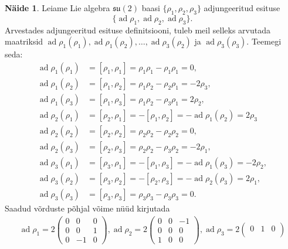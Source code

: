 \documentclass[a4paper,12pt]{article}
\theoremstyle{plain}
\theoremstyle{definition}
\newtheorem{naide}{Näide}[section]
\numberwithin{equation}{section}
\DeclareMathOperator{\ad}{ad}
\begin{document}
\begin{naide}
Leiame Lie algebra $\mathfrak{su}\left(2\right)$ baasi $\{\rho_1, \rho_2, \rho_3\}$ adjungeeritud esituse
\[\{\ad \rho_1, \ad \rho_2, \ad \rho_3\}.\]
Arvestades adjungeeritud esituse definitsiooni, tuleb meil selleks arvutada maatriksid $\ad \rho_1 \left(\rho_1\right), \ad \rho_1 \left(\rho_2\right), \ldots, \ad \rho_3 \left(\rho_2\right)$ ja $\ad \rho_3 \left(\rho_3\right)$. Teemegi seda:
\begin{align*}
\ad \rho_1 \left(\rho_1\right) &= \left[\rho_1, \rho_1\right] = \rho_1 \rho_1 - \rho_1 \rho_1 = 0, \\
\ad \rho_1 \left(\rho_2\right) &= \left[\rho_1, \rho_2\right] = \rho_1 \rho_2 - \rho_2 \rho_1 = -2\rho_3, \\
\ad \rho_1 \left(\rho_3\right) &= \left[\rho_1, \rho_3\right] = \rho_1 \rho_2 - \rho_3 \rho_1 = 2\rho_2,  \\
\ad \rho_2 \left(\rho_1\right) &= \left[\rho_2, \rho_1\right] = - \left[\rho_1, \rho_2\right] = - \ad \rho_1 \left(\rho_2\right) = 2\rho_3 \\
\ad \rho_2 \left(\rho_2\right) &= \left[\rho_2, \rho_2\right] = \rho_2 \rho_2 - \rho_2 \rho_2 = 0, \\
\ad \rho_2 \left(\rho_3\right) &= \left[\rho_2, \rho_3\right] = \rho_2 \rho_2 - \rho_3 \rho_2 = -2\rho_1, \\
\ad \rho_3 \left(\rho_1\right) &= \left[\rho_3, \rho_1\right] = - \left[\rho_1, \rho_3\right] = - \ad \rho_1 \left(\rho_3\right) = -2\rho_2, \\
\ad \rho_3 \left(\rho_2\right) &= \left[\rho_3, \rho_2\right] = - \left[\rho_2, \rho_3\right] = - \ad \rho_2 \left(\rho_3\right) = 2\rho_1, \\
\ad \rho_3 \left(\rho_3\right) &= \left[\rho_3, \rho_3\right] = \rho_3 \rho_3 - \rho_3 \rho_3 = 0.
\end{align*}
Saadud võrduste põhjal võime nüüd kirjutada
\begin{align*}
\ad \rho_1 = 2\begin{pmatrix}
0 & 0 & 0 \\
0 & 0 & 1 \\
0 & -1 & 0
\end{pmatrix}, 
\ad \rho_2 = 2\begin{pmatrix}
0 & 0 & -1 \\
0 & 0 & 0 \\
1 & 0 & 0
\end{pmatrix}, 
\ad \rho_3 = 2\begin{pmatrix}
0 & 1 & 0 \\

\end{pmatrix}
\end{align*}
\end{naide}
\end{document}
